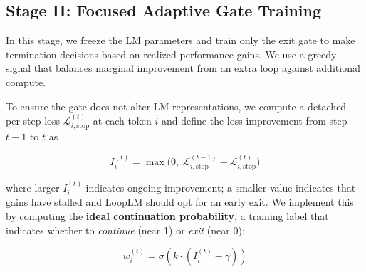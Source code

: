 \documentclass[]{bytedance_seed}
\newcommand{\1}{\mathbf{1}}
\newcommand{\ut}{LoopLM}
\begin{document}



\subsection{Stage II: Focused Adaptive Gate Training}\label{ut:adaptive_exit}


In this stage, we freeze the LM parameters and train only the exit gate to make termination decisions based on realized performance gains. We use a greedy signal that balances marginal improvement from an extra loop against additional compute. 

To ensure the gate does not alter LM representations, we compute a detached per-step loss $\mathcal{L}_{i,\mathrm{stop}}^{(t)}$ at each token $i$ and define the loss improvement from step $t\!-\!1$ to $t$ as

\begin{equation}\label{eqdef:improvement-per-step}
    I^{(t)}_i = \max\!\big(0,\ \mathcal{L}_{i,\mathrm{stop}}^{(t-1)} - \mathcal{L}_{i,\mathrm{stop}}^{(t)})
\end{equation}

where larger $I_i^{(t)}$ indicates ongoing improvement; a smaller value indicates that gains have stalled and \ut{} should opt for an early exit. We implement this by computing the \textbf{ideal continuation probability}, a training label that indicates whether to \textit{continue} (near 1) or \textit{exit} (near 0):

$$w^{(t)}_i = \sigma(k \cdot (I^{(t)}_i - \gamma))$$ 
\end{document}
